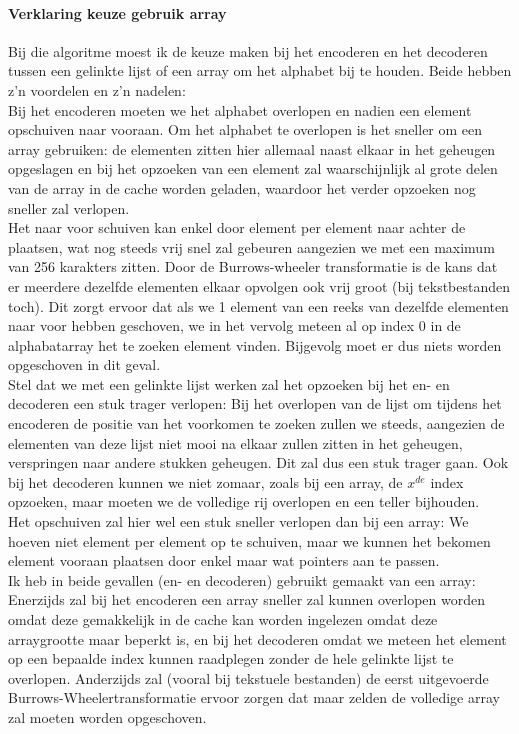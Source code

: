 \documentclass[11pt,a4paper]{article}
\begin{document}
\paragraph*{Verklaring keuze gebruik array}
Bij die algoritme moest ik de keuze maken bij het encoderen en het decoderen tussen een gelinkte lijst of een array om het alphabet bij te houden. Beide hebben z'n voordelen en z'n nadelen:\\
Bij het encoderen moeten we het alphabet overlopen en nadien een element opschuiven naar vooraan. Om het alphabet te overlopen is het sneller om een array gebruiken: de elementen zitten hier allemaal naast elkaar in het geheugen opgeslagen en bij het opzoeken van een element zal waarschijnlijk al grote delen van de array in de cache worden geladen, waardoor het verder opzoeken nog sneller zal verlopen. \\
Het naar voor schuiven kan enkel door element per element naar achter de plaatsen, wat nog steeds vrij snel zal gebeuren aangezien we met een maximum van 256 karakters zitten. Door de Burrows-wheeler transformatie is de kans dat er meerdere dezelfde elementen elkaar opvolgen ook vrij groot (bij tekstbestanden toch). Dit zorgt ervoor dat als we 1 element van een reeks van dezelfde elementen naar voor hebben geschoven, we in het vervolg meteen al op index 0 in de alphabatarray het te zoeken element vinden. Bijgevolg moet er dus niets worden opgeschoven in dit geval.\\

Stel dat we met een gelinkte lijst werken zal het opzoeken bij het en- en decoderen een stuk trager verlopen: Bij het overlopen van de lijst om tijdens het encoderen de positie van het voorkomen te zoeken zullen we steeds, aangezien de elementen van deze lijst niet mooi na elkaar zullen zitten in het geheugen, verspringen naar andere stukken geheugen. Dit zal dus een stuk trager gaan. Ook bij het decoderen kunnen we niet zomaar, zoals bij een array, de $x^{de}$ index opzoeken, maar moeten we de volledige rij overlopen en een teller bijhouden.\\
Het opschuiven zal hier wel een stuk sneller verlopen dan bij een array: We hoeven niet element per element op te schuiven, maar we kunnen het bekomen element vooraan plaatsen door enkel maar wat pointers aan te passen.\\

Ik heb in beide gevallen (en- en decoderen) gebruikt gemaakt van een array: Enerzijds zal bij het encoderen een array sneller zal kunnen overlopen worden omdat deze gemakkelijk in de cache kan worden ingelezen omdat deze arraygrootte maar beperkt is, en bij het decoderen omdat we meteen het element op een bepaalde index kunnen raadplegen zonder de hele gelinkte lijst te overlopen.
Anderzijds zal (vooral bij tekstuele bestanden) de eerst uitgevoerde Burrows-Wheelertransformatie ervoor zorgen dat maar zelden de volledige array zal moeten worden opgeschoven.
\end{document}
